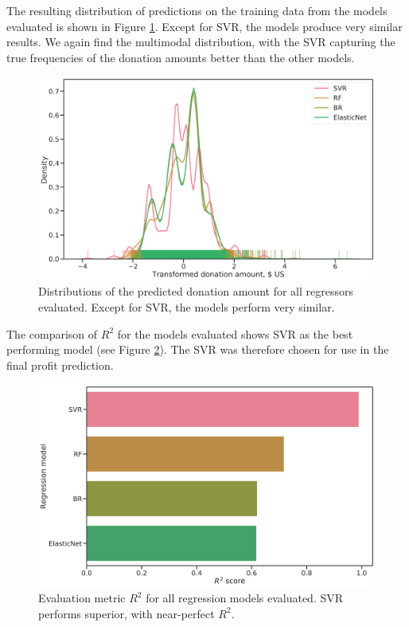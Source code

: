 \documentclass[
  11pt,
  a4paper,
  DIV=12,captions=tableheading,oneside,titlepage=firstiscover,abstracton]{scrreprt}
\begin{document}
The resulting distribution of predictions on the training data from the models evaluated is shown in Figure \ref{fig:reg-distrib}. Except for SVR, the models produce very similar results. We again find the multimodal distribution, with the SVR capturing the true frequencies of the donation amounts better than the other models.



\begin{figure}

{\centering \includegraphics[width=0.6\linewidth]{figures/predictions/regressor-predictions-comparison} 

}

\caption{Distributions of the predicted donation amount for all regressors evaluated. Except for SVR, the models perform very similar.}\label{fig:reg-distrib}
\end{figure}

The comparison of \(R^2\) for the models evaluated shows SVR as the best performing model (see Figure \ref{fig:reg-eval}). The SVR was therefore chosen for use in the final profit prediction.



\begin{figure}

{\centering \includegraphics[width=0.6\linewidth]{figures/predictions/regressor-score-comparison} 

}

\caption{Evaluation metric \(R^2\) for all regression models evaluated. SVR performs superior, with near-perfect \(R^2\).}\label{fig:reg-eval}
\end{figure}
\end{document}
